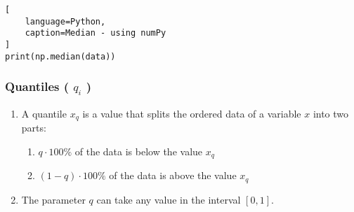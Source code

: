 \begin{lstlisting}[
    language=Python,
    caption=Median - using numPy
]
print(np.median(data))
\end{lstlisting}



\subsubsection{Quantiles ( $q_i$ ) \cite{statistics/book/Statistics-for-Data-Scientists/Maurits-Kaptein}} \label{Data/Describing Data/Central Tendency/Quantiles}

\begin{enumerate}
    \item A quantile $x_q$ is a value that splits the ordered data of a variable $x$ into two parts: \hfill \cite{statistics/book/Statistics-for-Data-Scientists/Maurits-Kaptein}
    \begin{enumerate}
        \item $q \cdot 100\%$ of the data is below the value $x_q$

        \item $(1 - q) \cdot 100\%$ of the data is above the value $x_q$
    \end{enumerate}

    \item The parameter $q$ can take any value in the interval $[0, 1]$. \hfill \cite{statistics/book/Statistics-for-Data-Scientists/Maurits-Kaptein}


\end{enumerate}
